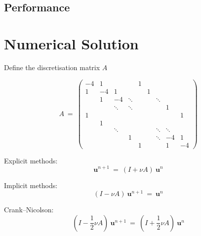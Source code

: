 \documentclass[12pt]{article}
\def \fr {\frac}
\begin{document}
\subsection{Performance}
















\section{Numerical Solution}

Define the discretisation matrix $A$

\[
  A \ =\
    \left(
      \begin{array}{ccccccccc}
        -4 &  1 &        &        & 1 &   &        &        &    \\
         1 & -4 &    1   &        &   & 1 &        &        &    \\
           &  1 &   -4   & \ddots &   &   & \ddots &        &    \\
           &    & \ddots & \ddots &   &   &        &    1   &    \\
         1 &    &        &        &   &   &        &        &  1 \\
           &  1 &        &        &   &   &        &        &    \\
           &    & \ddots &        &   &   & \ddots & \ddots &    \\
           &    &        &   1    &   &   & \ddots &   -4   &  1 \\
           &    &        &        & 1 &   &        &    1   & -4
      \end{array}
    \right)
\]

Explicit methods:
\[
  \mathbf{u}^{n+1} \ =\ \left( I + \nu A \right)\ \mathbf{u}^n
\]

Implicit methods:
\[
  \left( I - \nu A \right)\ \mathbf{u}^{n+1} \ =\ \mathbf{u}^n
\]

Crank--Nicolson:
\[
  \left( I - \fr{1}{2}\nu A \right)\ \mathbf{u}^{n+1} \ =\
  \left( I + \fr{1}{2}\nu A \right)\ \mathbf{u}^n
\]
\end{document}
